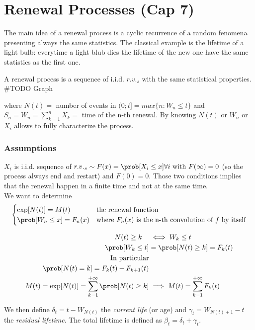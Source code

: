 \chapter{Renewal Processes (Cap 7)}
The main idea of a renewal process is a cyclic recurrence of a random fenomena presenting always the same statistics. The classical example is the lifetime of a light bulb: everytime a light blub dies the lifetime of the new one have the same statistics as the first one.

A renewal process is a sequence of i.i.d. $r.v._s$ with the same statistical properties. 
\#TODO Graph

where $N(t) = $ number of events in $(0;t] = max\{n : W_n \le t \}$ and $ S_n = W_n = \sum\limits_{k=1}^n X_k =$ time of the n-th renewal.
By knowing $N(t)$ or  $W_n$ or $X_i$ allows to fully characterize the process.

\subsection{Assumptions}
$X_i$ is i.i.d. sequence of $r.v._s \sim F(x) = \prob[X_i \le x]  \forall i \text{ with } F(\infty)=0$
(so the process always end and restart) and  $F(0)=0$. Those two conditions implies that the renewal happen in a finite time and not at the same time.
\\ We want to determine
$$\begin{cases}
  \exp[N(t)]=M(t) & \text{the renewal function} \\   \prob[W_n \le x] = F_n(x) & \text{where } F_n(x) \text{ is the n-th convolution of $f$ by itself}
\end{cases}$$

\begin{equation}\begin{split} \noindent
  N(t)\ge k \quad &\iff W_k \le t\\
  \prob[W_k \le t] &= \prob[N(t) \ge k] = F_k(t) \\
  \text{In particular} \\
  \prob[N(t)=k] = F_k(t)-F_{k+1}(t)& \\
  M(t) = \exp[N(t)]=\sum\limits_{k=1}^{+\infty}\prob[N(t)\ge k] &\implies M(t)=\sum\limits_{k=1}^{+\infty}F_k(t)
\end{split}\end{equation}

We then define $\delta_t = t - W_{N(t)}$ the \textit{current life} (or age) and $\gamma_t = W_{N(t)+1}-t$ the \textit{residual lifetime}.
The total lifetime is defined as $\beta_t = \delta_t + \gamma_t$.

